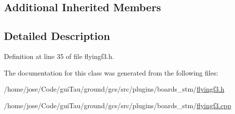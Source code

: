 \subsection*{Additional Inherited Members}


\subsection{Detailed Description}


Definition at line 35 of file flyingf3.\-h.



The documentation for this class was generated from the following files\-:\begin{DoxyCompactItemize}
\item 
/home/jose/\-Code/gui\-Tau/ground/gcs/src/plugins/boards\-\_\-stm/\hyperlink{flyingf3_8h}{flyingf3.\-h}\item 
/home/jose/\-Code/gui\-Tau/ground/gcs/src/plugins/boards\-\_\-stm/\hyperlink{flyingf3_8cpp}{flyingf3.\-cpp}\end{DoxyCompactItemize}
